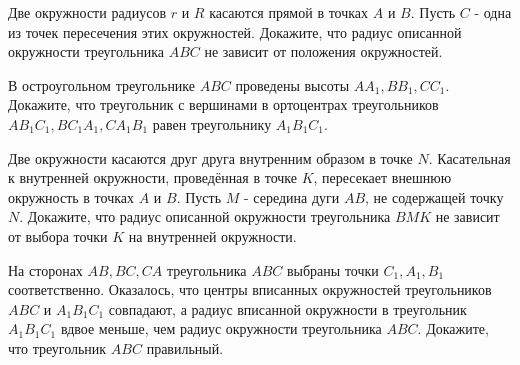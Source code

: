 \newpage

\hspace{3mm}

Две окружности радиусов $r$ и $R$ касаются прямой в точках $A$ и $B$. Пусть $C$ - одна из точек пересечения этих окружностей. Докажите, что радиус описанной окружности треугольника $A B C$ не зависит от положения окружностей.

В остроугольном треугольнике $A B C$ проведены высоты $A A_1, B B_1, C C_1$. Докажите, что треугольник с вершинами в ортоцентрах треугольников $A B_1 C_1, B C_1 A_1, C A_1 B_1$ равен треугольнику $A_1 B_1 C_1$.

Две окружности касаются друг друга внутренним образом в точке $N$. Касательная к внутренней окружности, проведённая в точке $K$, пересекает внешнюю окружность в точках $A$ и $B$. Пусть $M$ - середина дуги $A B$, не содержащей точку $N$. Докажите, что радиус описанной окружности треугольника $B M K$ не зависит от выбора точки $K$ на внутренней окружности.

На сторонах $A B, B C, C A$ треугольника $A B C$ выбраны точки $C_1, A_1, B_1$ соответственно. Оказалось, что центры вписанных окружностей треугольников $A B C$ и $A_1 B_1 C_1$ совпадают, а радиус вписанной окружности в треугольник $A_1 B_1 C_1$ вдвое меньше, чем радиус окружности треугольника $A B C$. Докажите, что треугольник $A B C$ правильный.
